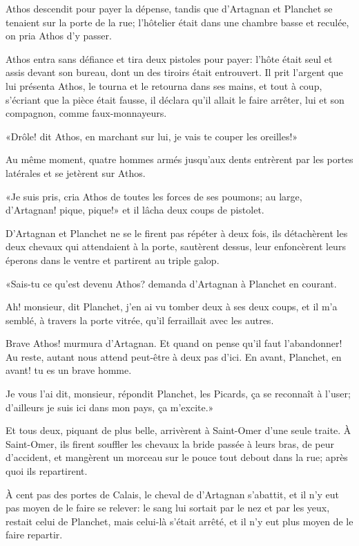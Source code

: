 Athos descendit pour payer la dépense, tandis que d'Artagnan et Planchet se tenaient sur la porte de la rue; l'hôtelier était dans une chambre basse et reculée, on pria Athos d'y passer. 

Athos entra sans défiance et tira deux pistoles pour payer: l'hôte était seul et assis devant son bureau, dont un des tiroirs était entrouvert. Il prit l'argent que lui présenta Athos, le tourna et le retourna dans ses mains, et tout à coup, s'écriant que la pièce était fausse, il déclara qu'il allait le faire arrêter, lui et son compagnon, comme faux-monnayeurs. 

«Drôle! dit Athos, en marchant sur lui, je vais te couper les oreilles!» 

Au même moment, quatre hommes armés jusqu'aux dents entrèrent par les portes latérales et se jetèrent sur Athos. 

«Je suis pris, cria Athos de toutes les forces de ses poumons; au large, d'Artagnan! pique, pique!» et il lâcha deux coups de pistolet. 

D'Artagnan et Planchet ne se le firent pas répéter à deux fois, ils détachèrent les deux chevaux qui attendaient à la porte, sautèrent dessus, leur enfoncèrent leurs éperons dans le ventre et partirent au triple galop. 

«Sais-tu ce qu'est devenu Athos? demanda d'Artagnan à Planchet en courant. 

\speak  Ah! monsieur, dit Planchet, j'en ai vu tomber deux à ses deux coups, et il m'a semblé, à travers la porte vitrée, qu'il ferraillait avec les autres. 

\speak  Brave Athos! murmura d'Artagnan. Et quand on pense qu'il faut l'abandonner! Au reste, autant nous attend peut-être à deux pas d'ici. En avant, Planchet, en avant! tu es un brave homme. 

\speak  Je vous l'ai dit, monsieur, répondit Planchet, les Picards, ça se reconnaît à l'user; d'ailleurs je suis ici dans mon pays, ça m'excite.» 

Et tous deux, piquant de plus belle, arrivèrent à Saint-Omer d'une seule traite. À Saint-Omer, ils firent souffler les chevaux la bride passée à leurs bras, de peur d'accident, et mangèrent un morceau sur le pouce tout debout dans la rue; après quoi ils repartirent. 

À cent pas des portes de Calais, le cheval de d'Artagnan s'abattit, et il n'y eut pas moyen de le faire se relever: le sang lui sortait par le nez et par les yeux, restait celui de Planchet, mais celui-là s'était arrêté, et il n'y eut plus moyen de le faire repartir. 

